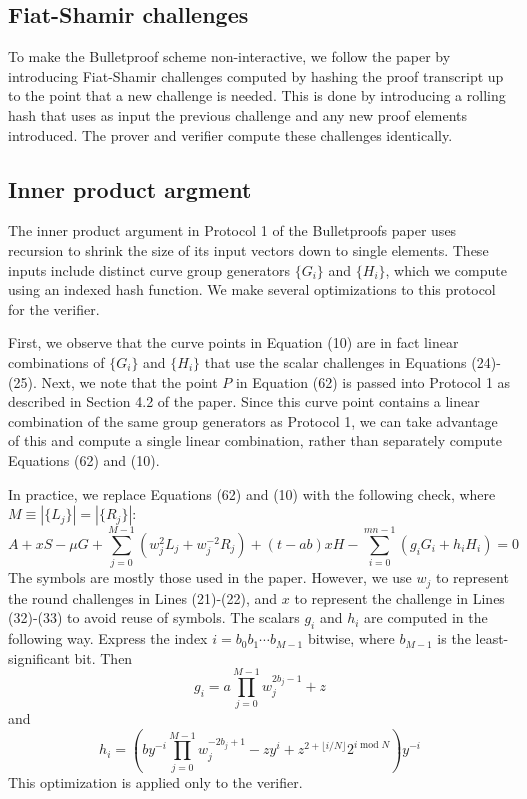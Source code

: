 \documentclass{mrl}
\begin{document}
\subsection{Fiat-Shamir challenges}
To make the Bulletproof scheme non-interactive, we follow the paper by introducing Fiat-Shamir challenges computed by hashing the proof transcript up to the point that a new challenge is needed. This is done by introducing a rolling hash that uses as input the previous challenge and any new proof elements introduced. The prover and verifier compute these challenges identically.

\subsection{Inner product argment}
The inner product argument in Protocol 1 of the Bulletproofs paper uses recursion to shrink the size of its input vectors down to single elements. These inputs include distinct curve group generators $\{G_i\}$ and $\{H_i\}$, which we compute using an indexed hash function. We make several optimizations to this protocol for the verifier.

First, we observe that the curve points in Equation (10) are in fact linear combinations of $\{G_i\}$ and $\{H_i\}$ that use the scalar challenges in Equations (24)-(25). Next, we note that the point $P$ in Equation (62) is passed into Protocol 1 as described in Section 4.2 of the paper. Since this curve point contains a linear combination of the same group generators as Protocol 1, we can take advantage of this and compute a single linear combination, rather than separately compute Equations (62) and (10).

In practice, we replace Equations (62) and (10) with the following check, where $M \equiv |\{L_j\}| = |\{R_j\}|$:
$$A + xS - \mu G + \sum_{j=0}^{M-1}(w_j^2 L_j + w_j^{-2} R_j) + (t - ab)xH - \sum_{i=0}^{mn-1}(g_iG_i + h_iH_i) = 0$$
The symbols are mostly those used in the paper. However, we use $w_j$ to represent the round challenges in Lines (21)-(22), and $x$ to represent the challenge in Lines (32)-(33) to avoid reuse of symbols. The scalars $g_i$ and $h_i$ are computed in the following way. Express the index $i = b_0b_1 \cdots b_{M-1}$ bitwise, where $b_{M-1}$ is the least-significant bit. Then
$$g_i = a\prod_{j=0}^{M-1} w_j^{2b_j-1} + z$$
and
$$h_i = \left(by^{-i}\prod_{j=0}^{M-1} w_j^{-2b_j+1} - zy^i + z^{2+\lfloor i/N \rfloor}2^{i\operatorname{mod}N}\right)y^{-i}$$
This optimization is applied only to the verifier.
\end{document}
